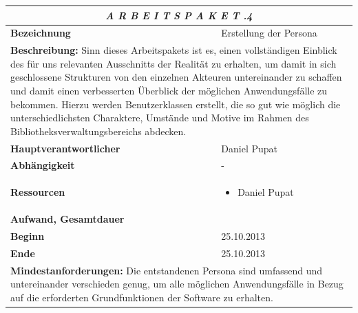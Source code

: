 \documentclass[fontsize=12pt,paper=a4,twoside]{scrartcl}
\begin{document}
\begin{tabular}{p{7.5cm}|p{7.5cm}}\toprule
\multicolumn{2}{c}{\textbf{\textit{A R B E I T S P A K E T \quad 2.2.4}}} \\ \toprule \hline
\textbf{Bezeichnung} & Erstellung der Persona\\\hline
\multicolumn{2}{p{15cm}}{\textbf{Beschreibung:} \newline 
Sinn dieses Arbeitspakets ist es, einen vollständigen Einblick des für uns relevanten Ausschnitts der Realität zu erhalten, um damit in sich geschlossene Strukturen von den einzelnen Akteuren untereinander zu schaffen und damit einen verbesserten Überblick der möglichen Anwendungsfälle zu bekommen. Hierzu werden Benutzerklassen erstellt, die so gut wie möglich die unterschiedlichsten Charaktere, Umstände und Motive im Rahmen des Bibliotheksverwaltungsbereichs abdecken. }  \\\hline
\textbf{Hauptverantwortlicher} & Daniel Pupat \\\hline
\textbf{Abhängigkeit} & -\\\hline
\textbf{Ressourcen} & \begin{itemize} 
\itemsep0pt
\item Daniel Pupat
\end{itemize} \\\hline
\textbf{Aufwand, Gesamtdauer} & \\\hline
\textbf{Beginn} & 25.10.2013 \\\hline
\textbf{Ende} & 25.10.2013\\\hline
\multicolumn{2}{p{15cm}}{\textbf{Mindestanforderungen: } \newline
 Die entstandenen Persona sind umfassend und untereinander verschieden genug, um alle möglichen Anwendungsfälle in Bezug auf die erforderten Grundfunktionen der Software zu erhalten. }  \\ \toprule
\end{tabular} \\\\
\end{document}
